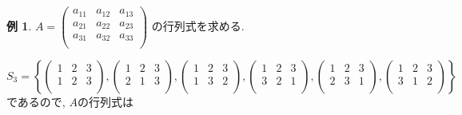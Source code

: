 \documentclass[dvipdfmx,a4paper,11pt]{article} %
\theoremstyle{definition}
\newtheorem{exa}[thm]{例}
\begin{document}
\begin{exa}\cite[例 3.1.15]{O}
$A = 
  \begin{pmatrix}
a_{11}& a_{12} & a_{13}\\
a_{21}& a_{22} & a_{23}\\
a_{31}& a_{32} & a_{33}\\
 \end{pmatrix} 
$
の行列式を求める.

$S_3 = \left\{   
\begin{pmatrix}
1& 2 &3\\
1& 2 &3\\
 \end{pmatrix} , 
\begin{pmatrix}
1& 2 &3\\
2& 1 &3\\
 \end{pmatrix} , 
\begin{pmatrix}
1& 2 &3\\
1& 3 &2\\
 \end{pmatrix} , 
 \begin{pmatrix}
1& 2 &3\\
3& 2 &1\\
 \end{pmatrix} , 
 \begin{pmatrix}
1& 2 &3\\
2& 3 &1\\
 \end{pmatrix} , 
 \begin{pmatrix}
1& 2 &3\\
3& 1 &2\\
 \end{pmatrix}
  \right\}$
  であるので, $A$の行列式は
  

\end{exa}
\end{document}
